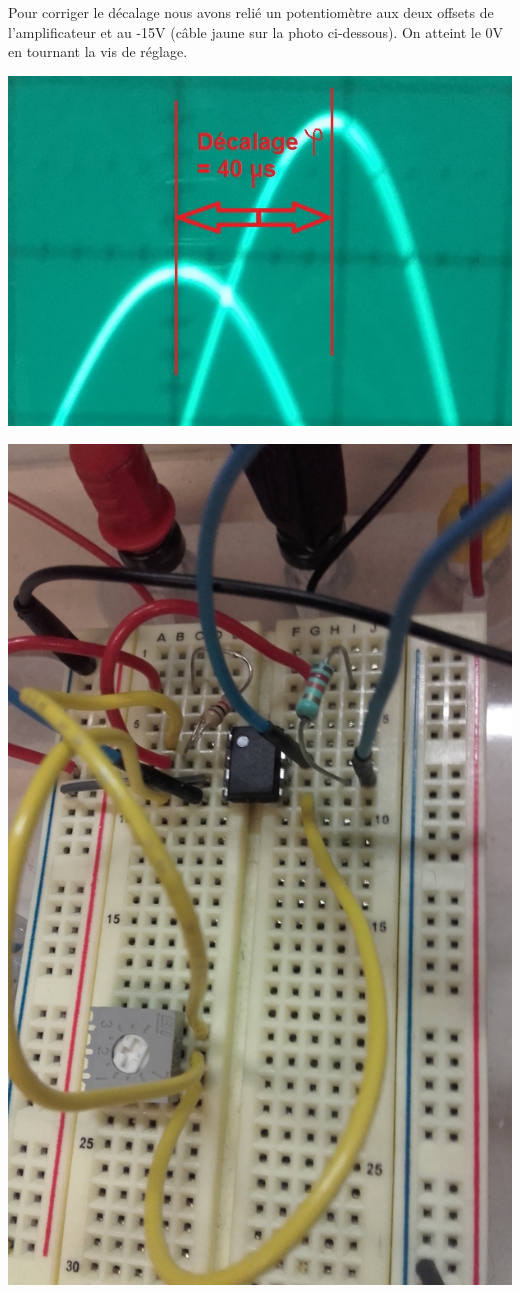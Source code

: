 \documentclass[11pt,a4paper]{article}
\begin{document}
Pour corriger le décalage nous avons relié un potentiomètre aux deux offsets de l'amplificateur et au -15V (câble jaune sur la photo ci-dessous). On atteint le 0V en tournant la vis de réglage.\\
\begin{multicols}{2}
\includegraphics[scale=0.3]{osc3}

\columnbreak

\includegraphics[scale=0.07]{montage1}
\end{multicols}
\end{document}
